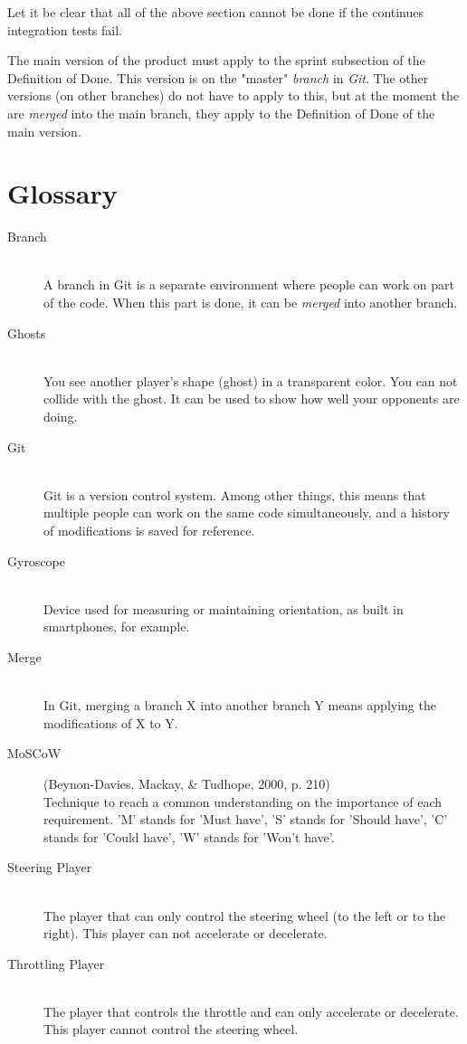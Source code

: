 \documentclass[11pt,twoside,a4paper]{article}
\begin{document}
Let it be clear that all of the above section cannot be done if the continues integration tests fail.

The main version of the product must apply to the sprint subsection of the Definition of Done. This version is on the "master" \emph{branch} in \emph{Git}. The other versions (on other branches) do not have to apply to this, but at the moment the are \emph{merged} into the main branch, they apply to the Definition of Done of the main version.


\newpage

\section{Glossary}

\begin{description}

\item[Branch] \hfill \\
A branch in Git is a separate environment where people can work on part of the code. When this part is done, it can be \emph{merged} into another branch.

\item[Ghosts] \hfill \\
You see another player's shape (ghost) in a transparent color. You can not collide with the ghost. It can be used to show how well your opponents are doing.

\item[Git] \hfill \\
Git is a version control system. Among other things, this means that multiple people can work on the same code simultaneously, and a history of modifications is saved for reference.

\item[Gyroscope] \hfill \\
Device used for measuring or maintaining orientation, as built in smartphones, for example.

\item[Merge] \hfill \\
In Git, merging a branch X into another branch Y means applying the modifications of X to Y.

\item[MoSCoW] (Beynon-Davies, Mackay, \& Tudhope, 2000, p. 210) \hfill \\
Technique to reach a common understanding on the importance of each requirement. 'M' stands for 'Must have', 'S' stands for 'Should have', 'C' stands for 'Could have', 'W' stands for 'Won't have'.

\item[Steering Player] \hfill \\
The player that can only control the steering wheel (to the left or to the right). This player can not accelerate or decelerate.

\item[Throttling Player] \hfill \\
The player that controls the throttle and can only accelerate or decelerate. This player cannot control the steering wheel.

\end{description}
\end{document}
